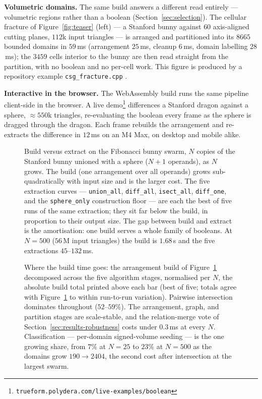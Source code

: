 \documentclass{egpubl}
\begin{document}
\textbf{Volumetric domains.} The same build answers a different read entirely --- volumetric regions rather than a boolean (Section~\ref{sec:selection}). The cellular fracture of Figure~\ref{fig:teaser} (left) --- a Stanford bunny against $60$ axis-aligned cutting planes, $112$k input triangles --- is arranged and partitioned into its $8665$ bounded domains in $59$\,ms (arrangement $25$\,ms, cleanup $6$\,ms, domain labelling $28$\,ms); the $3459$ cells interior to the bunny are then read straight from the partition, with no boolean and no per-cell work. This figure is produced by a repository example \texttt{csg\_fracture.cpp} \cite{trueform2025}.

\textbf{Interactive in the browser.} The WebAssembly build runs the same pipeline client-side in the browser. A live demo\footnote{\texttt{trueform.polydera.com/live-examples/boolean}} differences a Stanford dragon against a sphere, $\approx\!550$k triangles, re-evaluating the boolean every frame as the sphere is dragged through the dragon. Each frame rebuilds the arrangement and re-extracts the difference in $12$\,ms on an M4 Max, on desktop and mobile alike.

\begin{figure}[t]
  \centering
  
  \caption{Build versus extract on the Fibonacci bunny swarm, $N$ copies of the Stanford bunny unioned with a sphere ($N{+}1$ operands), as $N$ grows. The build (one arrangement over all operands) grows sub-quadratically with input size and is the larger cost. The five extraction curves --- \texttt{union\_all}, \texttt{diff\_all}, \texttt{isect\_all}, \texttt{diff\_one}, and the \texttt{sphere\_only} construction floor --- are each the best of five runs of the same extraction; they sit far below the build, in proportion to their output size. The gap between build and extract is the amortisation: one build serves a whole family of booleans. At $N{=}500$ ($56$\,M input triangles) the build is $1.68$\,s and the five extractions $45$--$132$\,ms.}
  \label{fig:performance}
\end{figure}

\begin{figure}[t]
  \centering
  
  \caption{Where the build time goes: the arrangement build of Figure~\ref{fig:performance} decomposed across the five algorithm stages, normalised per $N$, the absolute build total printed above each bar (best of five; totals agree with Figure~\ref{fig:performance} to within run-to-run variation). Pairwise intersection dominates throughout ($52$--$59\%$). The arrangement, graph, and partition stages are scale-stable, and the relation-merge vote of Section~\ref{sec:results-robustness} costs under $0.3$\,ms at every $N$. Classification --- per-domain signed-volume seeding --- is the one growing share, from $7\%$ at $N{=}25$ to $23\%$ at $N{=}500$ as the domains grow $190 \to 2404$, the second cost after intersection at the largest swarm.}
  \label{fig:stages}
\end{figure}
\end{document}
